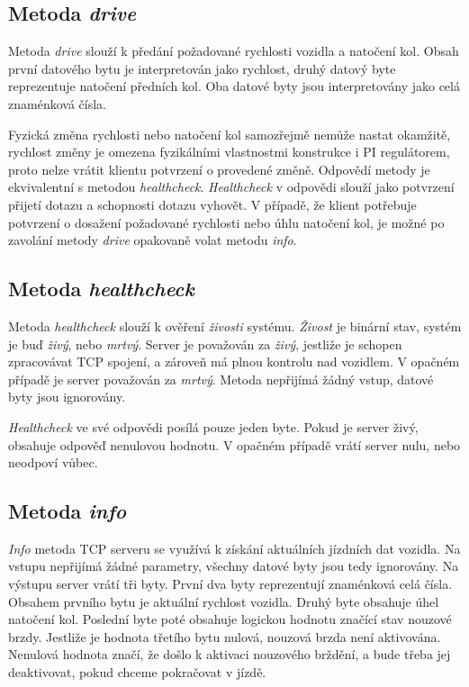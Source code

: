 \documentclass[czech, bachelor]{diploma}
\begin{document}
\subsection{Metoda \emph{drive}}
Metoda \emph{drive} slouží k předání požadované rychlosti vozidla a natočení kol. Obsah první datového bytu je interpretován jako
rychlost, druhý datový byte reprezentuje natočení předních kol. Oba datové byty jsou interpretovány jako celá znaménková čísla.

Fyzická změna rychlosti nebo natočení kol samozřejmě nemůže nastat okamžitě, rychlost změny je omezena fyzikálními vlastnostmi
konstrukce i PI regulátorem, proto nelze vrátit klientu potvrzení o provedené změně. Odpovědí metody je ekvivalentní s metodou
\emph{healthcheck}. \emph{Healthcheck} v odpovědi slouží jako potvrzení přijetí dotazu a schopnosti dotazu vyhovět. V případě,
že klient potřebuje potvrzení o dosažení požadované rychlosti nebo úhlu natočení kol, je možné po zavolání metody \emph{drive}
opakovaně volat metodu \emph{info}.

\subsection{Metoda \emph{healthcheck}}
Metoda \emph{healthcheck} slouží k ověření \emph{živosti} systému. \emph{Živost} je binární stav, systém je buď \emph{živý}, nebo
\emph{mrtvý}. Server je považován za \emph{živý}, jestliže je schopen zpracovávat TCP spojení, a zároveň má plnou kontrolu
nad vozidlem. V opačném případě je server považován za \emph{mrtvý}. Metoda nepřijímá žádný vstup, datové byty jsou ignorovány.

\emph{Healthcheck} ve své odpovědi posílá pouze jeden byte. Pokud je server živý, obsahuje odpověď nenulovou hodnotu. V opačném
případě vrátí server nulu, nebo neodpoví vůbec.

\subsection{Metoda \emph{info}}
\emph{Info} metoda TCP serveru se využívá k získání aktuálních jízdních dat vozidla. Na vstupu nepřijímá žádné parametry, všechny
datové byty jsou tedy ignorovány. Na výstupu server vrátí tři byty. První dva byty reprezentují znaménková celá čísla. Obsahem
prvního bytu je aktuální rychlost vozidla. Druhý byte obsahuje úhel natočení kol. Poslední byte poté obsahuje logickou hodnotu
značící stav nouzové brzdy. Jestliže je hodnota třetího bytu nulová, nouzová brzda není aktivována. Nenulová hodnota značí,
že došlo k aktivaci nouzového brždění, a bude třeba jej deaktivovat, pokud chceme pokračovat v jízdě.
\end{document}
